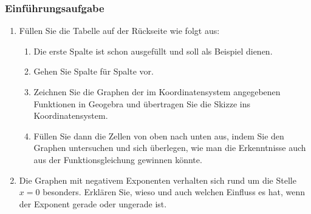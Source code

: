 \subsubsection{Einführungsaufgabe}
\begin{enumerate}
    \item Füllen Sie die Tabelle auf der Rückseite wie folgt aus:
          \begin{enumerate}
              \item Die erste Spalte ist schon ausgefüllt und soll als Beispiel dienen.
              \item Gehen Sie Spalte für Spalte vor.
              \item Zeichnen Sie die Graphen der im Koordinatensystem angegebenen Funktionen in Geogebra und übertragen Sie die Skizze ins Koordinatensystem.
              \item Füllen Sie dann die Zellen von oben nach unten aus, indem Sie den Graphen untersuchen und sich überlegen, wie man die Erkenntnisse auch aus der Funktionsgleichung gewinnen könnte.
          \end{enumerate}
    \item Die Graphen mit negativem Exponenten verhalten sich rund um die Stelle $x=0$ besonders. Erklären Sie, wieso und auch welchen Einfluss es hat, wenn der Exponent gerade oder ungerade ist.
\end{enumerate}
